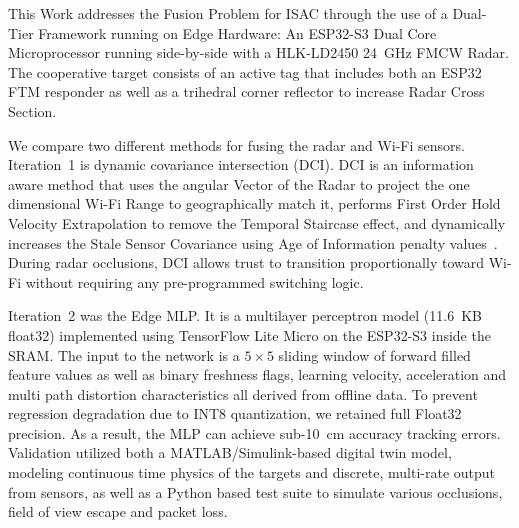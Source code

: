 This Work addresses the Fusion Problem for ISAC through the use of a Dual-Tier Framework running on Edge Hardware: An ESP32-S3 Dual Core Microprocessor running side-by-side with a HLK-LD2450 24~GHz FMCW Radar. The cooperative target consists of an active tag that includes both an ESP32 FTM responder as well as a trihedral corner reflector to increase Radar Cross Section.

We compare two different methods for fusing the radar and Wi-Fi sensors. Iteration~1 is dynamic covariance intersection (DCI). DCI is an information aware method that uses the angular Vector of the Radar to project the one dimensional Wi-Fi Range to geographically match it, performs First Order Hold Velocity Extrapolation to remove the Temporal Staircase effect, and dynamically increases the Stale Sensor Covariance using Age of Information penalty values~\cite{noroozi_aoi}. During radar occlusions, DCI allows trust to transition proportionally toward Wi-Fi without requiring any pre-programmed switching logic.

Iteration~2 was the Edge MLP. It is a multilayer perceptron model (11.6~KB float32) implemented using TensorFlow Lite Micro on the ESP32-S3 inside the SRAM. The input to the network is a $5 \times 5$ sliding window of forward filled feature values as well as binary freshness flags, learning velocity, acceleration and multi path distortion characteristics all derived from offline data. To prevent regression degradation due to INT8 quantization, we retained full Float32 precision. As a result, the MLP can achieve sub-10~cm accuracy tracking errors. Validation utilized both a MATLAB/Simulink-based digital twin model, modeling continuous time physics of the targets and discrete, multi-rate output from sensors, as well as a Python based test suite to simulate various occlusions, field of view escape and packet loss.
